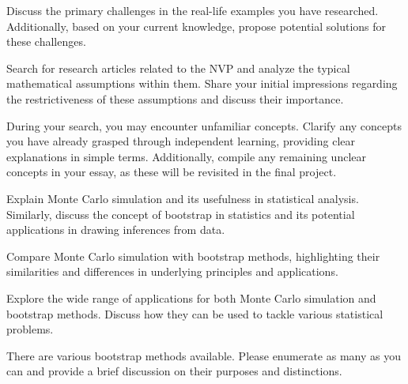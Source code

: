  Discuss the primary challenges in the real-life examples you have researched. Additionally, based
on your current knowledge, propose potential solutions for these challenges.

 Search for research articles related to the NVP and analyze the typical mathematical assumptions
within them. Share your initial impressions regarding the restrictiveness of these assumptions
and discuss their importance.

 During your search, you may encounter unfamiliar concepts. Clarify any concepts you have
already grasped through independent learning, providing clear explanations in simple terms.
Additionally, compile any remaining unclear concepts in your essay, as these will be revisited in
the final project.

 Explain Monte Carlo simulation and its usefulness in statistical analysis. Similarly, discuss the
concept of bootstrap in statistics and its potential applications in drawing inferences from data.

 Compare Monte Carlo simulation with bootstrap methods, highlighting their similarities and
differences in underlying principles and applications.

 Explore the wide range of applications for both Monte Carlo simulation and bootstrap methods.
Discuss how they can be used to tackle various statistical problems.

 There are various bootstrap methods available. Please enumerate as many as you can and provide
a brief discussion on their purposes and distinctions.

